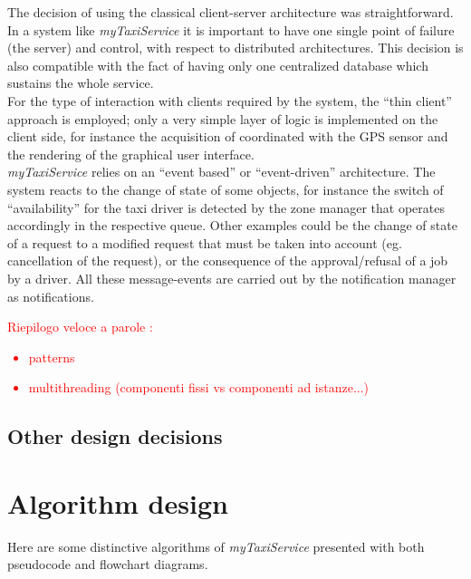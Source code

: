 \documentclass[a4paper,11pt]{report} %
\newcommand{\mts}{\mbox{\normalfont\itshape myTaxiService}}
\begin{document}
	The decision of using the classical client-server architecture was straightforward. In a system like \mts{} it is important to have one single point of failure (the server) and control, with respect to distributed architectures. This decision is also compatible with the fact of having only one centralized database which sustains the whole service.\\
	For the type of interaction with clients required by the system, the ``thin client'' approach is employed; only a very simple layer of logic is implemented on the client side, for instance the acquisition of coordinated with the GPS sensor and the rendering of the graphical user interface.\\
	\mts{} relies on an ``event based'' or ``event-driven'' architecture. The system reacts to the change of state of some objects, for instance the switch of ``availability'' for the taxi driver is detected by the zone manager that operates accordingly in the respective queue. Other examples could be the change of state of a request to a modified request that must be taken into account (eg. cancellation of the request), or the consequence of the approval/refusal of a job by a driver. All these message-events are carried out by the notification manager as notifications.\\
	\textcolor{red}{Riepilogo veloce a parole :\begin{itemize}
			\item patterns
			\item multithreading (componenti fissi vs componenti ad istanze...)
		\end{itemize}}	
	
	\subsection{Other design decisions}

	\section{Algorithm design}
	Here are some distinctive algorithms of \mts{} presented with both pseudocode and flowchart diagrams.
\end{document}
